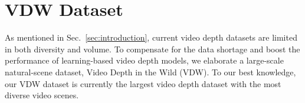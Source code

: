 \documentclass[10pt,twocolumn,letterpaper]{article}
\def\data{VDW}
\def\refsec{Sec.}
\begin{document}
\begin{table}
\begin{center}
\addtolength{\tabcolsep}{-4.2pt}
\end{center}
\vspace{-12pt}
\caption{\textbf{Comparisons of video depth datasets.}  The 3D Movies dataset of Midas~\cite{midas} is not released
and only contains 75k images but not videos. TartanAir~\cite{tata} only has some limited dynamic scenes (\textit{e.g.}, fish in the ocean sequence). However, most videos in TartanAir~\cite{tata} lack major dynamic objects (\textit{e.g.}, pedestrians). For example, models
trained on TartanAir cannot predict satisfactory results
in scenes with moving people as such scenes are rare. Our \data{} dataset shows advantages in diversity and quantity. }

\label{tab:dacp}
\end{table}

\section{\data{} Dataset}
As mentioned in \refsec{}~\ref{sec:introduction}, current video depth datasets are limited in both diversity and volume. To compensate for the data shortage and boost the performance of learning-based video depth models, we elaborate a large-scale natural-scene dataset, Video Depth in the Wild (VDW). To our best knowledge, our \data{} dataset is currently the largest video depth dataset with the most diverse video scenes.
\end{document}
